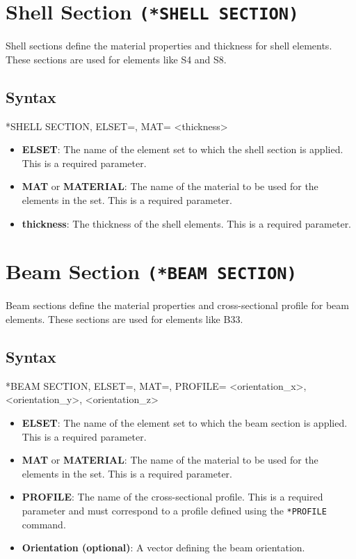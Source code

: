 \section{Shell Section \texttt{(*SHELL SECTION)}}
Shell sections define the material properties and thickness for shell elements. These sections are used for elements like S4 and S8.

\subsection{Syntax}
\begin{codeBlock}
*SHELL SECTION, ELSET=, MAT=
<thickness>
\end{codeBlock}

\begin{itemize}
\item \textbf{ELSET}: The name of the element set to which the shell section is applied. This is a required parameter.
\item \textbf{MAT} or \textbf{MATERIAL}: The name of the material to be used for the elements in the set. This is a required parameter.
\item \textbf{thickness}: The thickness of the shell elements. This is a required parameter.
\end{itemize}

\section{Beam Section \texttt{(*BEAM SECTION)}}
Beam sections define the material properties and cross-sectional profile for beam elements. These sections are used for elements like B33.

\subsection{Syntax}
\begin{codeBlock}
*BEAM SECTION, ELSET=, MAT=, PROFILE=
<orientation_x>, <orientation_y>, <orientation_z>
\end{codeBlock}

\begin{itemize}
\item \textbf{ELSET}: The name of the element set to which the beam section is applied. This is a required parameter.
\item \textbf{MAT} or \textbf{MATERIAL}: The name of the material to be used for the elements in the set. This is a required parameter.
\item \textbf{PROFILE}: The name of the cross-sectional profile. This is a required parameter and must correspond to a profile defined using the \texttt{*PROFILE} command.
\item \textbf{Orientation (optional)}: A vector  defining the beam orientation.
\end{itemize}

